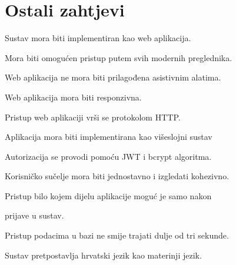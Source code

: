 		\section{Ostali zahtjevi}
		\begin{packed_item}
		\item Sustav mora biti implementiran kao web aplikacija.
		\item Mora biti omogućen pristup putem svih modernih preglednika.
		\item Web aplikacija ne mora biti prilagođena asistivnim alatima.
		\item Web aplikacija mora biti responzivna.
		\item Pristup web aplikaciji vrši se protokolom HTTP.
		\item Aplikacija mora biti implementirana kao višeslojni sustav
		\item Autorizacija se provodi pomoću JWT i bcrypt algoritma.
		\item Korisničko sučelje mora biti jednostavno i izgledati kohezivno.
		\item Pristup bilo kojem dijelu aplikacije moguć je samo nakon \item prijave u sustav.
		\item Pristup podacima u bazi ne smije trajati dulje od tri sekunde.
		\item Sustav pretpostavlja hrvatski jezik kao materinji jezik.
	\end{packed_item} 
	